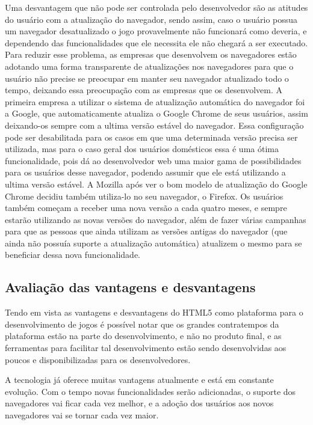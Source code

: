 Uma desvantagem que não pode ser controlada pelo desenvolvedor são as
atitudes do usuário com a atualização do navegador, sendo assim, caso
o usuário possua um navegador desatualizado o jogo provavelmente não
funcionará como deveria, e dependendo das funcionalidades que ele
necessita ele não chegará a ser executado. Para reduzir esse problema,
as empresas que desenvolvem os navegadores estão adotando uma forma
transparente de atualizações nos navegadores para que o usuário não
precise se preocupar em manter seu navegador atualizado todo o tempo,
deixando essa preocupação com as empresas que os desenvolvem.
A primeira empresa a utilizar o sistema de atualização automática do
navegador foi a Google, que automaticamente atualiza o Google Chrome
de seus usuários, assim deixando-os sempre com a ultima versão estável
do navegador. Essa configuração pode ser desabilitada para os casos em
que uma determinada versão precisa ser utilizada, mas para o caso
geral dos usuários domésticos essa é uma ótima funcionalidade, pois dá
ao desenvolvedor web uma maior gama de possibilidades para os usuários
desse navegador, podendo assumir que ele está utilizando a ultima
versão estável.
A Mozilla após ver o bom modelo de atualização do Google Chrome
decidiu também utiliza-lo no seu navegador, o Firefox. Os usuários
também começam a receber uma nova versão a cada quatro meses, e sempre
estarão utilizando as novas versões do navegador, além de fazer várias
campanhas para que as pessoas que ainda utilizam as versões antigas do navegador (que ainda
não possuía suporte a atualização automática) atualizem o mesmo para
se beneficiar dessa nova funcionalidade.

\subsection{Avaliação das vantagens e desvantagens}

Tendo em vista as vantagens e desvantagens do HTML5 como plataforma
para o desenvolvimento de jogos é possível notar que os grandes
contratempos da plataforma estão na parte do desenvolvimento, e não no
produto final, e as ferramentas para facilitar tal desenvolvimento
estão sendo desenvolvidas aos poucos e disponibilizadas para os
desenvolvedores.

A tecnologia já oferece muitas vantagens atualmente e está em
constante evolução. Com o tempo novas funcionalidades serão
adicionadas, o suporte dos navegadores vai ficar cada vez melhor, e a
adoção dos usuários aos novos navegadores vai se tornar cada vez
maior.

